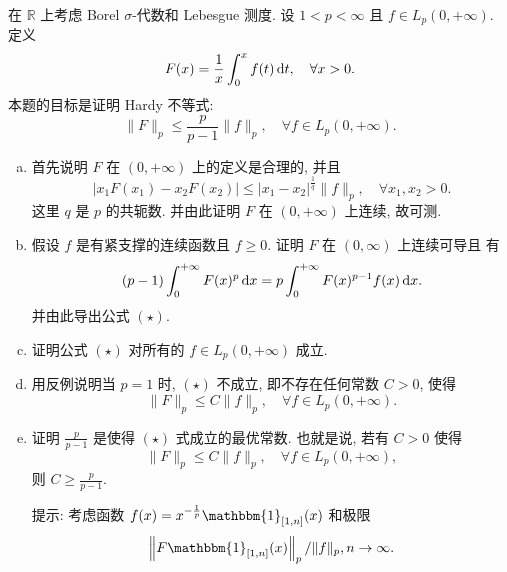 \begin{exercise}
  在 $\mathbb{R}$ 上考虑 Borel $\sigma$-代数和 Lebesgue 测度. 设 $1<p<\infty$ 且 $f \in L_{p}(0,+\infty)$. 定义
  \[F(x)=\frac{1}{x} \int_{0}^{x} f(t) \mathop{}\!\mathrm{d} t, \quad \forall x>0.\]
  本题的目标是证明 Hardy 不等式:
  \begin{equation}
    \|F\|_{p} \leq \frac{p}{p-1}\|f\|_{p}, \quad \forall f \in L_{p}(0,+\infty). \tag{$\star$}
  \end{equation}
  \begin{enumerate}[(a)]
    \item 首先说明 $F$ 在 $(0,+\infty)$ 上的定义是合理的, 并且
      \[|x_1 F(x_1)-x_2 F(x_2)| \leq|x_1-x_2|^{\frac{1}{q}}\|f\|_{p},
        \quad \forall x_{1}, x_{2}>0.\]
      这里 $q$ 是 $p$ 的共轭数. 并由此证明 $F$ 在 $(0,+\infty)$ 上连续, 故可测.
    \item 假设 $f$ 是有紧支撑的连续函数且 $f \geq 0$. 证明 $F$ 在 $(0, \infty)$ 上连续可导且 有
      \[(p-1)\int_{0}^{+\infty} F(x)^{p}\mathop{}\!\mathrm{d} x = p\int_{0}^{+\infty} F(x)^{p-1}f(x)\mathop{}\!\mathrm{d} x.\]
      并由此导出公式 $(\star)$.
    \item 证明公式 $(\star)$ 对所有的 $f \in L_{p}(0,+\infty)$ 成立.
    \item 用反例说明当 $p=1$ 时, $(\star)$ 不成立, 即不存在任何常数 $C>0$, 使得
      \[\|F\|_{p} \leq C\|f\|_{p}, \quad \forall f \in L_{p}(0,+\infty).\]
    \item 证明 $\frac{p}{p-1}$ 是使得 $(\star)$ 式成立的最优常数. 也就是说, 若有 $C>0$ 使得
      \[\|F\|_{p} \leq C\|f\|_{p}, \quad \forall f \in L_{p}(0,+\infty),\]
      则 $C\geq\frac{p}{p-1}$.

      提示: 考虑函数 $f(x)=x^{-\frac{1}{p}} \mathbbm{1}_{[1, n]}(x)$ 和极限
      \[
        \left\|F \mathbbm{1}_{[1, n]}(x)\right\|_{p} /\|f\|_{p}, n \rightarrow \infty.
      \]
  \end{enumerate}
\end{exercise}


